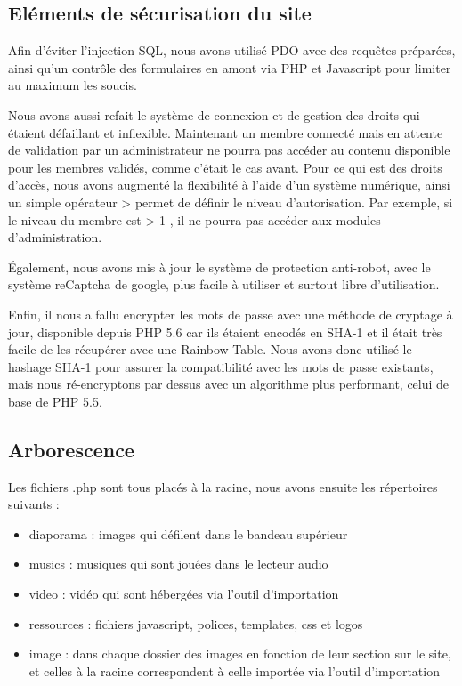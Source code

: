\documentclass[11pt]{report}
\begin{document}
\subsection{Eléments de sécurisation du site}
Afin d'éviter l'injection SQL, nous avons utilisé PDO avec des requêtes
préparées, ainsi qu'un contrôle des formulaires en amont via PHP et Javascript
pour limiter au maximum les soucis. \\
\par Nous avons aussi refait le système de connexion et de gestion des droits
qui étaient défaillant et inflexible. Maintenant un membre connecté mais
en attente de validation par un administrateur ne pourra pas accéder au contenu
disponible pour les membres validés, comme c'était le cas avant. Pour ce qui est
des droits d'accès, nous avons augmenté la flexibilité à l'aide d'un système
numérique, ainsi un simple opérateur \og > \fg{} permet de définir le niveau
d'autorisation. Par exemple, si le niveau du membre est \og > 1 \fg{}, il ne
pourra pas accéder aux modules d'administration. \\
 \par Également, nous avons mis à jour le système de protection anti-robot, avec
 le système reCaptcha de google, plus facile à utiliser et surtout libre 
 d'utilisation.
 
 \par Enfin, il nous a fallu encrypter les mots de passe avec une méthode de
 cryptage à jour, disponible depuis PHP 5.6 car ils étaient encodés en SHA-1 et
 il était très facile de les récupérer avec une Rainbow Table. Nous avons donc
 utilisé le hashage SHA-1 pour assurer la compatibilité avec les mots de passe
 existants, mais nous ré-encryptons par dessus avec un algorithme plus
 performant, celui de base de PHP 5.5.
 
 \subsection{Arborescence}
 Les fichiers .php sont tous placés à la racine, nous avons ensuite les
 répertoires suivants : \\
 \begin{itemize}
   \item diaporama : images qui défilent dans le bandeau
   supérieur
   \item musics : musiques qui sont jouées dans le lecteur audio
   \item video : vidéo qui sont hébergées via l'outil d'importation
   \item ressources : fichiers javascript, polices, templates, css et logos 
   \item image : dans chaque dossier des images en fonction de leur section sur
   le site, et celles à la racine correspondent à celle importée via l'outil
   d'importation
 \end{itemize}
 
\end{document}
